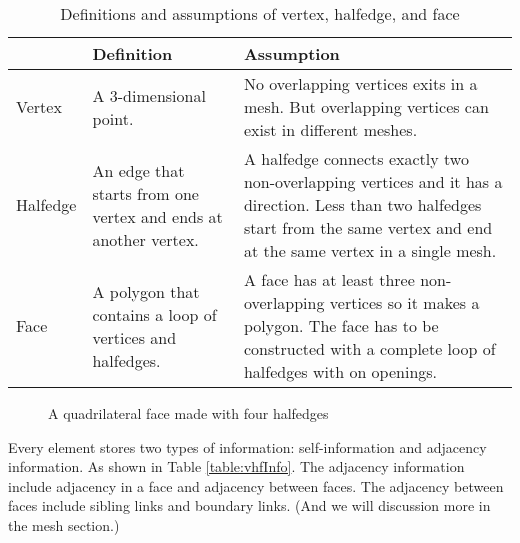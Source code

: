 \documentclass[12pt]{article}
\begin{document}
\begin{table}[h]
\centering
\begin{tabular}{| l | p{} | p{}|}

\hline
		&	Definition	& Assumption	\\
\hline
Vertex	&	A 3-dimensional point.		&	No overlapping vertices exits in a mesh. But overlapping vertices can exist in different meshes.\\
\hline
Halfedge	&	An edge that starts from one vertex and ends at another vertex. & A halfedge connects exactly two non-overlapping vertices and it has a direction. 
Less than two halfedges start from the same vertex and end at the same vertex in a single mesh.\\
\hline
Face		&	A polygon that contains a loop of vertices and halfedges.	& A face has at least three non-overlapping vertices so it makes a polygon. The face has to be constructed with a complete loop of halfedges with on openings.\\
\hline
\end{tabular}
\caption{Definitions and assumptions of vertex, halfedge, and face} 
\label{table:vhfdef}
\end{table}

\begin{figure}[h]
  \centering
  \caption{A quadrilateral face made with four halfedges}
  \label{figure:singleFace}
\end{figure}

Every element stores two types of information: self-information and adjacency information. As shown in Table \ref{table:vhfInfo}. The adjacency information include adjacency in a face and adjacency between faces. The adjacency between faces include sibling links and boundary links. (And we will discussion more in the mesh section.) 
\end{document}
